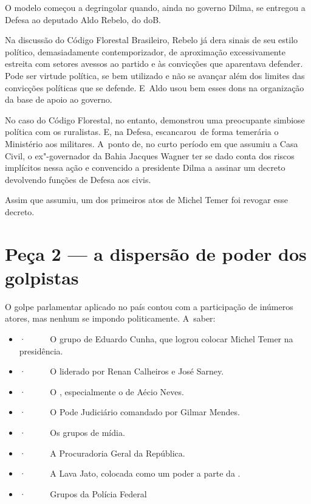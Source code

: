 O modelo começou a degringolar quando, ainda no governo Dilma, se
entregou a Defesa ao deputado Aldo Rebelo, do doB.

Na discussão do Código Florestal Brasileiro, Rebelo já dera sinais de
seu estilo político, demasiadamente contemporizador, de aproximação
excessivamente estreita com setores avessos ao partido e às convicções
que aparentava defender. Pode ser virtude política, se bem utilizado e
não se avançar além dos limites das convicções políticas que se defende.
E~Aldo usou bem esses dons na organização da base de apoio ao governo.

No caso do Código Florestal, no entanto, demonstrou uma preocupante
simbiose política com os ruralistas. E, na Defesa, escancarou~de forma
temerária o Ministério aos militares. A~ponto de, no curto período em
que assumiu a Casa Civil, o ex"-governador da Bahia Jacques Wagner ter se
dado conta dos riscos implícitos nessa ação e convencido a presidente
Dilma a assinar um decreto devolvendo funções de Defesa aos civis.

Assim que assumiu, um dos primeiros atos de Michel Temer foi revogar
esse decreto.

\section{Peça 2 --- a dispersão de poder dos golpistas}

O golpe parlamentar aplicado no país contou com a participação de
inúmeros atores, mas nenhum se impondo politicamente. A~saber:

\begin{itemize}
\itemsep1pt\parskip0pt
\item
  ·~~~~~ O grupo de Eduardo Cunha, que logrou colocar Michel Temer na
  presidência.
\item
  ·~~~~~ O  liderado por Renan Calheiros e José Sarney.
\item
  ·~~~~~ O , especialmente o de Aécio Neves.
\item
  ·~~~~~ O Pode Judiciário comandado por Gilmar Mendes.
\item
  ·~~~~~ Os grupos de mídia.
\item
  ·~~~~~ A Procuradoria Geral da República.
\item
  ·~~~~~ A Lava Jato, colocada como um poder a parte da .
\item
  ·~~~~~ Grupos da Polícia Federal
\end{itemize}

